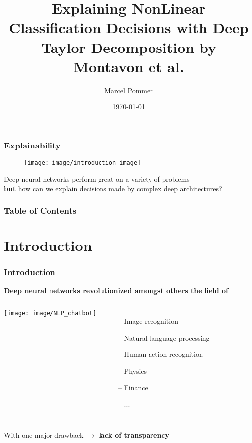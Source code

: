 \documentclass{beamer}
\begin{document}
\title[Deep Taylor Decomposition]{Explaining NonLinear Classification Decisions with Deep Taylor Decomposition by Montavon et al.}  
\author{Marcel Pommer}
\date{\today} 

\begin{frame}
\titlepage
\end{frame} 

\begin{frame}
\frametitle[Explainability]{Explainability}
\vspace{0.25cm}
\begin{figure}
\texttt{[image: image/introduction\_image]}
\end{figure}
\vspace{0.25cm}
Deep neural networks perform great on a variety of problems \nocite{*}\\
\textbf{but} how can we explain decisions made by complex deep architectures?\\
\end{frame} 


\begin{frame}
\frametitle[Table of Contents]{Table of Contents}
\vspace{0.4cm}
\tableofcontents
\end{frame} 



\section[Introduction]{Introduction}
\begin{frame}
\frametitle{Introduction} 
\textbf{Deep neural networks revolutionized amongst others the field of}\\
\vspace{0.25cm}
       \begin{columns}[T]
             \centering
             \texttt{[image: image/NLP\_chatbot]}
			\begin{itemize}
			\item[--] Image recognition
			\item[--] Natural language processing
			\item[--] Human action recognition
			\item[--] Physics
			\item[--] Finance
			\item[--] ...
			\end{itemize}
         \end{columns} 
\pause
\vspace{0.5cm}
With one major drawback $\rightarrow$ \textbf{lack of transparency}
\end{frame}
\end{document}
